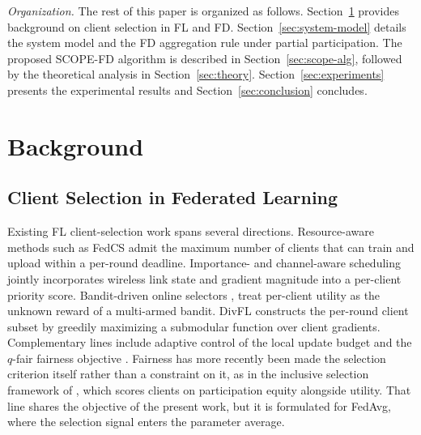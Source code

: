 \documentclass[journal]{IEEEtran}
\newcommand{\rev}[1]{#1}
\begin{document}

\textit{Organization.} The rest of this paper is organized as follows. Section~\ref{sec:related-work} provides background on client selection in FL and FD. Section~\ref{sec:system-model} details the system model and the FD aggregation rule under partial participation. The proposed SCOPE-FD algorithm is described in Section~\ref{sec:scope-alg}, followed by the theoretical analysis in Section~\ref{sec:theory}. Section~\ref{sec:experiments} presents the experimental results and Section~\ref{sec:conclusion} concludes.

\section{Background}
\label{sec:related-work}

\subsection{Client Selection in Federated Learning}
\label{ssec:rw-fl-selection}

Existing FL client-selection work spans several directions. Resource-aware methods such as FedCS \cite{nishio2019client} admit the maximum number of clients that can train and upload within a per-round deadline. Importance- and channel-aware scheduling \cite{yang2020scheduling, ren2020scheduling, shi2020joint} jointly incorporates wireless link state and gradient magnitude into a per-client priority score. Bandit-driven online selectors \cite{xia2020mab}, \cite{cho2020bandit} treat per-client utility as the unknown reward of a multi-armed bandit. DivFL \cite{balakrishnan2022divfl} constructs the per-round client subset by greedily maximizing a submodular function over client gradients. Complementary lines include adaptive control of the local update budget \cite{wang2019adaptive} and the $q$-fair fairness objective \cite{li2020qffl}. \rev{Fairness has more recently been made the selection criterion itself rather than a constraint on it, as in the inclusive selection framework of \cite{arisdakessian2026vox}, which scores clients on participation equity alongside utility. That line shares the objective of the present work, but it is formulated for FedAvg, where the selection signal enters the parameter average.}
\end{document}
